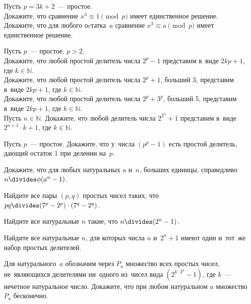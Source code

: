 \begin{problems}

\item
Пусть $p = 3 k + 2$~— простое.
\\
\subproblem
Докажите, что сравнение $x^3 \equiv 1 \pmod{p}$ имеет единственное решение.
\\
\subproblem
Докажите, что для любого оcтатка~$a$ сравнение $x^3 \equiv a \pmod{p}$ имеет
единственное решение.

\item
Пусть $p$~— простое, $p > 2$.
\\
\subproblem
Докажите, что любой простой делитель числа $2^p - 1$ представим
в~виде $2 k p + 1$, где $k \in \mathbb{N}$.
\\
\subproblem
Докажите, что любой простой делитель числа $2^p + 1$, больший 3, представим
в~виде $2 k p + 1$, где $k \in \mathbb{N}$.
\\
\subproblem
Докажите, что любой простой делитель числа $2^p + 3^p$, больший 5, представим
в~виде $2 k p + 1$, где $k \in \mathbb{N}$.
\\
\subproblem
Пусть $n \in \mathbb{N}$.
Докажите, что любой делитель числа $2^{2^n} + 1$ представим
в~виде $2^{n+1} \cdot k + 1$, где $k \in \mathbb{N}$.

\item
Пусть $p$~— простое.
Докажите, что у~числа $(p^p - 1)$ есть простой делитель, дающий остаток 1 при
делении на~$p$.

\item
Докажите, что для любых натуральных $a$ и~$n$, больших единицы, справедливо
$n \divides \mathrm{\phi}(a^n - 1)$.

\item
Найдите все пары $(p, q)$ простых чисел таких, что
$p q \divides (7^{p} - 2^{p}) \cdot (7^{q} - 2^{q})$.

\item
Найдите все натуральные $n$ такие, что $n \divides (2^n - 1)$.

\item
Найдите все натуральные $n$, для которых числа $n$ и~$2^n + 1$ имеют один
и~тот~же набор простых делителей. 	

\item
Для натурального~$a$ обозначим через $P_a$ множество всех простых чисел,
не~являющихся делителями ни~одного из~чисел вида $(2^{k \cdot 2^a} - 1)$, где
$k$~— нечетное натуральное число.
Докажите, что при любом натуральном $a$ множество $P_a$ бесконечно.

\end{problems}

